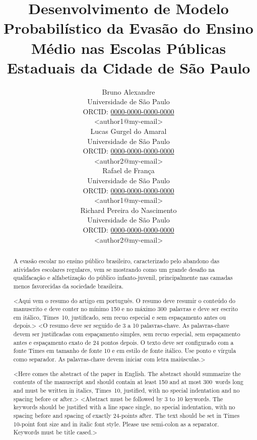 \documentclass[english, spanish, brazilian]{RBIEarticle} %
\title{Desenvolvimento de Modelo Probabilístico da Evasão do Ensino Médio nas Escolas Públicas Estaduais da Cidade de São Paulo}
\author{%
	\parbox{3.8cm}{%
		Bruno Alexandre\\
		Universidade de São Paulo\\
		ORCID: \href{https://orcid.org/0000-0000-0000-0000}{0000-0000-0000-0000}\\
		<author1@my-email>
	}
        \hspace{0.3cm}
	\parbox{3.8cm}{%
		Lucas Gurgel do Amaral\\
		Universidade de São Paulo\\
		ORCID: \href{https://orcid.org/0000-0000-0000-0000}{0000-0000-0000-0000}\\
		<author2@my-email>
	}
        \hspace{0.3cm}
        \parbox{3.8cm}{%
		Rafael de França\\
		Universidade de São Paulo\\
		ORCID: \href{https://orcid.org/0000-0000-0000-0000}{0000-0000-0000-0000}\\
		<author1@my-email>
	}
        \hspace{0.3cm}
	\parbox{3.9cm}{\raggedright%
		Richard Pereira do Nascimento\\
		Universidade de São Paulo\\
		ORCID: \href{https://orcid.org/0000-0000-0000-0000}{0000-0000-0000-0000}\\
		<author2@my-email>
	}
}
\begin{document}
\maketitle

\begin{otherlanguage}{brazilian}
\begin{abstract}
A evasão escolar no ensino público brasileiro, caracterizado pelo abandono das atividades escolares regulares, vem se mostrando como um grande desafio na qualifacação e alfabetização do público infanto-juvenil, principalmente nas camadas menos favorecidas da sociedade brasileira. 
\end{abstract}
\end{otherlanguage}

\begin{otherlanguage}{brazilian}
\begin{abstract}
<Aqui vem o resumo do artigo em português. O resumo deve resumir o conteúdo do manuscrito e deve conter no mínimo 150 e no máximo 300~palavras e deve ser escrito em itálico, Times~10, justificado, sem recuo especial e sem espaçamento antes ou depois.>
\keywords <O resumo deve ser seguido de 3 a 10 palavras-chave. As palavras-chave devem ser justificadas com espaçamento simples, sem recuo especial, sem espaçamento antes e espaçamento exato de 24 pontos depois. O texto deve ser configurado com a fonte Times em tamanho de fonte 10 e em estilo de fonte itálico. Use ponto e vírgula como separador. As palavras-chave devem iniciar com letra maiúsculas.>
\end{abstract}
\end{otherlanguage}

\begin{otherlanguage}{english}
\begin{abstract}
<Here comes the abstract of the paper in English. The abstract should summarize the contents of the manuscript and should contain at least 150 and at most 300~words long and must be written in italics, Times~10, justified, with no special indentation and no spacing before or after.>
\keywords <Abstract must be followed by 3 to 10 keywords. The keywords should be justified with a line space single, no special indentation, with no spacing before and spacing of exactly 24-points after. The text should be set in Times 10-point font size and in italic font style. Please use semi-colon as a separator. Keywords must be title cased.>
\end{abstract}
\end{otherlanguage}
\end{document}
